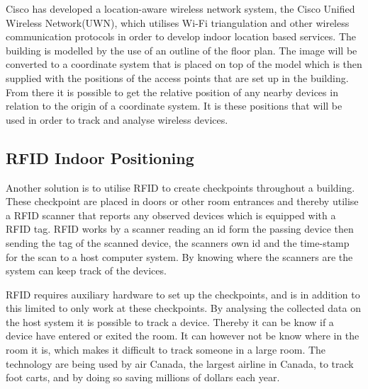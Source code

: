 Cisco has developed a location-aware wireless network system, the Cisco Unified Wireless Network(UWN), which utilises Wi-Fi triangulation\cite{CiscoTri} and other wireless communication protocols in order to develop indoor location based services\cite{uwn}. 
The building is modelled by the use of an outline of the floor plan. The image will be converted to a coordinate system that is placed on top of the model which is then supplied with the positions of the access points that are set up in the building. From there it is possible to get the relative position of any nearby devices in relation to the origin of a coordinate system. It is these positions that will be used in order to track and analyse wireless devices.

\subsection{RFID Indoor Positioning}
Another solution is to utilise RFID to create checkpoints throughout a building. These checkpoint are placed in doors or other room entrances and thereby utilise a RFID scanner that reports any observed devices which is equipped with a RFID tag\cite{indoor_bin}. 
RFID works by a scanner reading an id form the passing device then sending the tag of the scanned device, the scanners own id and the time-stamp for the scan to a host computer system. By knowing where the scanners are the system can keep track of the devices\cite{RFIDjournal}.

RFID requires auxiliary hardware to set up the checkpoints, and is in addition to this limited to only work at these checkpoints. By analysing the collected data on the host system it is possible to track a device. Thereby it can be know if a device have entered or exited the room. It can however not be know where in the room it is, which makes it difficult to track someone in a large room.
The technology are being used by air Canada, the largest airline in Canada, to track foot carts, and by doing so saving millions of dollars each year\cite{RFIDjournal}.




